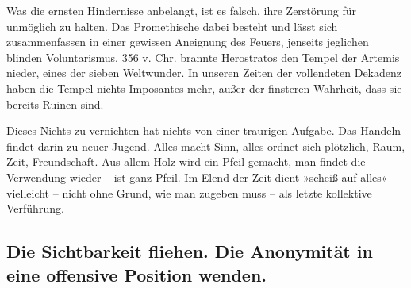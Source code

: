 Was die ernsten Hindernisse anbelangt, ist es falsch, ihre
Zerstörung für unmöglich zu halten. Das Promethische dabei besteht
und lässt sich zusammenfassen in einer gewissen Aneignung des
Feuers, jenseits jeglichen blinden Voluntarismus. 356 v. Chr.
brannte Herostratos den Tempel der Artemis nieder, eines der sieben
Weltwunder. In unseren Zeiten der vollendeten Dekadenz haben die
Tempel nichts Imposantes mehr, außer der finsteren Wahrheit, dass
sie bereits Ruinen sind.

Dieses Nichts zu vernichten hat nichts von einer traurigen Aufgabe.
Das Handeln findet darin zu neuer Jugend. Alles macht Sinn, alles
ordnet sich plötzlich, Raum, Zeit, Freundschaft. Aus allem Holz
wird ein Pfeil gemacht, man findet die Verwendung wieder – ist ganz
Pfeil. Im Elend der Zeit dient »scheiß auf alles« vielleicht –
nicht ohne Grund, wie man zugeben muss – als letzte kollektive
Verführung.

\subsection{Die Sichtbarkeit fliehen. Die Anonymität in eine 
offensive Position wenden.}

